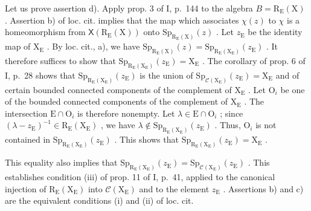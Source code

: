 Let us prove assertion d). Apply prop. 3 of I, p.~144 to the algebra \(B = \mathrm{R}_{\mathrm{E}}(\mathrm{X})\) . Assertion b) of loc. cit. implies that the map which associates \(\chi(z)\) to \(\chi\) is a homeomorphism from \(\mathsf{X}(\mathrm{R}_{\mathrm{E}}(\mathrm{X}))\) onto \(\mathrm{Sp}_{\mathrm{R}_{\mathrm{E}}(\mathrm{X})}(z)\) . Let \(z_{\mathrm{E}}\) be the identity map of \(\mathrm{X}_{\mathrm{E}}\) . By loc. cit., a), we have \(\mathrm{Sp}_{\mathrm{R}_{\mathrm{E}}(\mathrm{X})}(z) = \mathrm{Sp}_{\mathrm{R}_{\mathrm{E}}(\mathrm{X}_{\mathrm{E}})}(z_{\mathrm{E}})\) . It therefore suffices to show that \(\mathrm{Sp}_{\mathrm{R}_{\mathrm{E}}(\mathrm{X}_{\mathrm{E}})}(z_{\mathrm{E}}) = \mathrm{X}_{\mathrm{E}}\) . The corollary of prop. 6 of I, p.~28 shows that \(\mathrm{Sp}_{\mathrm{R}_{\mathrm{E}}(\mathrm{X}_{\mathrm{E}})}(z_{\mathrm{E}})\) is the union of \(\mathrm{Sp}_{\mathcal{C}(\mathrm{X}_{\mathrm{E}})}(z_{\mathrm{E}}) = \mathrm{X}_{\mathrm{E}}\) and of certain bounded connected components of the complement of \(\mathrm{X}_{\mathrm{E}}\) . Let \(\mathrm{O}_{i}\) be one of the bounded connected components of the complement of \(\mathrm{X}_{\mathrm{E}}\) . The intersection \(\mathrm{E} \cap \mathrm{O}_{i}\) is therefore nonempty. Let \(\lambda \in \mathrm{E} \cap \mathrm{O}_{i}\) ; since \((\lambda - z_{\mathrm{E}})^{-1} \in \mathrm{R}_{\mathrm{E}}(\mathrm{X}_{\mathrm{E}})\) , we have \(\lambda \notin \mathrm{Sp}_{\mathrm{R}_{\mathrm{E}}(\mathrm{X}_{\mathrm{E}})}(z_{\mathrm{E}})\) . Thus, \(\mathrm{O}_{i}\) is not contained in \(\mathrm{Sp}_{\mathrm{R}_{\mathrm{E}}(\mathrm{X}_{\mathrm{E}})}(z_{\mathrm{E}})\) . This shows that \(\mathrm{Sp}_{\mathrm{R}_{\mathrm{E}}(\mathrm{X}_{\mathrm{E}})}(z_{\mathrm{E}}) = \mathrm{X}_{\mathrm{E}}\) .

This equality also implies that \(\mathrm{Sp}_{\mathrm{R}_{\mathrm{E}}(\mathrm{X}_{\mathrm{E}})}(z_{\mathrm{E}})=\mathrm{Sp}_{\mathcal{C}(\mathrm{X}_{\mathrm{E}})}(z_{\mathrm{E}})\) . This establishes condition (iii) of prop. 11 of I, p.~41, applied to the canonical injection of \(\mathrm{R}_{\mathrm{E}}(\mathrm{X}_{\mathrm{E}})\) into \(\mathcal{C}(\mathrm{X}_{\mathrm{E}})\) and to the element \(z_{\mathrm{E}}\) . Assertions b) and c) are the equivalent conditions (i) and (ii) of loc. cit.

